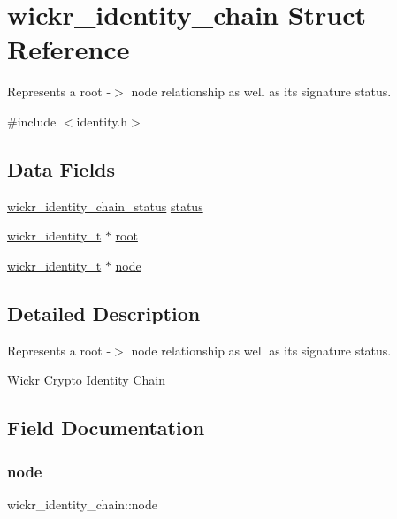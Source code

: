 \hypertarget{structwickr__identity__chain}{}\section{wickr\+\_\+identity\+\_\+chain Struct Reference}
\label{structwickr__identity__chain}


Represents a root -\/$>$ node relationship as well as it\textquotesingle{}s signature status.  




{\ttfamily \#include $<$identity.\+h$>$}

\subsection*{Data Fields}
\begin{DoxyCompactItemize}
\item 
\mbox{\hyperlink{group__wickr__identity_ga78aefa3835eb13ca75c0129583b5ebfa}{wickr\+\_\+identity\+\_\+chain\+\_\+status}} \mbox{\hyperlink{structwickr__identity__chain_acee365b411eb4a7e7c68c115d60e166e}{status}}
\item 
\mbox{\hyperlink{structwickr__identity}{wickr\+\_\+identity\+\_\+t}} $\ast$ \mbox{\hyperlink{structwickr__identity__chain_a0982b1510591138e2e7d0546741bc6e0}{root}}
\item 
\mbox{\hyperlink{structwickr__identity}{wickr\+\_\+identity\+\_\+t}} $\ast$ \mbox{\hyperlink{structwickr__identity__chain_a4343dae5f1c82057289c26e5c7bb1226}{node}}
\end{DoxyCompactItemize}


\subsection{Detailed Description}
Represents a root -\/$>$ node relationship as well as it\textquotesingle{}s signature status. 

Wickr Crypto Identity Chain 

\subsection{Field Documentation}
\mbox{\label{structwickr__identity__chain_a4343dae5f1c82057289c26e5c7bb1226}} 
\subsubsection{\texorpdfstring{node}{node}}
{\footnotesize\ttfamily wickr\+\_\+identity\+\_\+chain\+::node}


